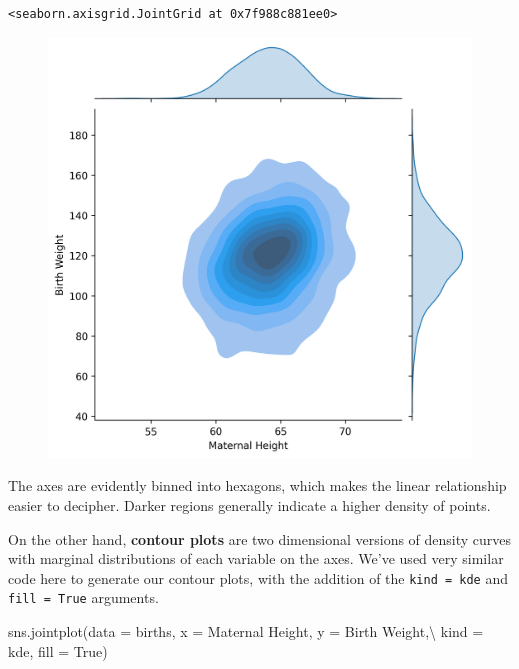 \documentclass[
  letterpaper,
  DIV=11,
  numbers=noendperiod]{scrreprt}
\newenvironment{Shaded}{\begin{snugshade}}{\end{snugshade}}
\newcommand{\NormalTok}[1]{\textcolor[rgb]{0.00,0.23,0.31}{#1}}
\newcommand{\OperatorTok}[1]{\textcolor[rgb]{0.37,0.37,0.37}{#1}}
\newcommand{\StringTok}[1]{\textcolor[rgb]{0.13,0.47,0.30}{#1}}
\newcommand{\VariableTok}[1]{\textcolor[rgb]{0.07,0.07,0.07}{#1}}
\begin{document}
\begin{verbatim}
<seaborn.axisgrid.JointGrid at 0x7f988c881ee0>
\end{verbatim}

\begin{figure}[H]

{\centering \includegraphics{visualization_2/visualization_2_files/figure-pdf/cell-11-output-2.png}

}

\end{figure}

The axes are evidently binned into hexagons, which makes the linear
relationship easier to decipher. Darker regions generally indicate a
higher density of points.

On the other hand, \textbf{contour plots} are two dimensional versions
of density curves with marginal distributions of each variable on the
axes. We've used very similar code here to generate our contour plots,
with the addition of the
\texttt{kind\ =\ \textquotesingle{}kde\textquotesingle{}} and
\texttt{fill\ =\ True} arguments.

\begin{Shaded}
\begin{Highlighting}[]
\NormalTok{sns.jointplot(data }\OperatorTok{=}\NormalTok{ births, x }\OperatorTok{=} \StringTok{\textquotesingle{}Maternal Height\textquotesingle{}}\NormalTok{, y }\OperatorTok{=} \StringTok{\textquotesingle{}Birth Weight\textquotesingle{}}\NormalTok{,}\OperatorTok{\textbackslash{}}
\NormalTok{              kind }\OperatorTok{=} \StringTok{\textquotesingle{}kde\textquotesingle{}}\NormalTok{, fill }\OperatorTok{=} \VariableTok{True}\NormalTok{)}
\end{Highlighting}
\end{Shaded}
\end{document}

